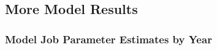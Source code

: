 \documentclass[12pt]{article}
\begin{document}




\subsection{More Model Results} \label{modelresults}
\subsubsection{Model Job Parameter Estimates by Year}

\clearpage

\clearpage

\clearpage

\clearpage

\clearpage

\end{document}
